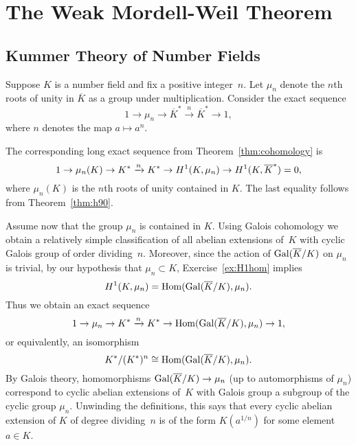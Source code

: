 
\chapter{The Weak Mordell-Weil Theorem}\label{ch:weakmw}

\section{Kummer Theory of Number Fields}\label{sec:kummernf}

Suppose $K$ is a number field and fix a positive integer~$n$.
Let $\mu_n$ denote the $n$th roots of unity in $\overline{K}$ as a group
under multiplication. Consider the exact sequence
\[
  1 \to \mu_n \to \overline{K}^* \xrightarrow{n} \overline{K}^* \to 1,
\]
where $n$ denotes the map $a\mapsto a^n$.

The corresponding long exact sequence from Theorem~\ref{thm:cohomology}
is
\[
  1 \to \mu_n(K) \to K^* \xrightarrow{n} K^*
  \to H^1(K,\mu_n) \to H^1(K,\overline{K}^*) =0,
\]
where $\mu_n(K)$ is the $n$th roots of unity contained in $K$.
The last equality follows from Theorem~\ref{thm:h90}.

Assume now that the group $\mu_n$ is contained in $K$.
Using Galois cohomology we obtain a relatively simple classification
of all abelian extensions of~$K$ with cyclic Galois group of order
dividing~$n$. Moreover, since the action of $\operatorname{Gal}(\overline{K}/K)$ on
$\mu_n$ is trivial, by our hypothesis that $\mu_n\subset K$,
Exercise~\ref{ex:H1hom} implies
\[
  H^1(K,\mu_n) = \operatorname{Hom}(\operatorname{Gal}(\overline{K}/K),\mu_n).
\]
Thus we obtain an exact sequence
\[
  1 \to \mu_n \to K^* \xrightarrow{n} K^*
  \to \operatorname{Hom}(\operatorname{Gal}(\overline{K}/K),\mu_n) \to 1,
\]
or equivalently, an isomorphism
\[
  K^*/(K^*)^n \cong \operatorname{Hom}(\operatorname{Gal}(\overline{K}/K),\mu_n).
\]
By Galois theory, homomorphisms $\operatorname{Gal}(\overline{K}/K)\to \mu_n$ (up to
automorphisms of $\mu_n$) correspond to cyclic abelian extensions
of~$K$ with Galois group a subgroup of the cyclic group $\mu_n$.
Unwinding the definitions, this says that every
cyclic abelian extension of $K$ of degree dividing~$n$ is of the form
$K(a^{1/n})$ for some element $a\in K$.

